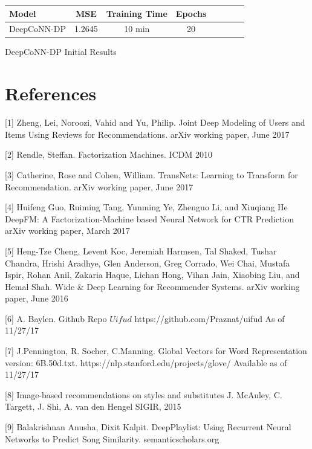 \documentclass[10pt,twocolumn,letterpaper]{article}
\begin{document}
\begin{exhibit}
\begin{center}
{\small
\begin{tabular}{l|ccccccc}
\hline
Model & MSE & Training Time & Epochs \\
\hline
DeepCoNN-DP & 1.2645 & 10 min & 20  \\
\hline
\end{tabular}
}
\end{center}
\caption{DeepCoNN-DP Initial Results}
\end{exhibit}


\section{References}

[1] Zheng, Lei, Noroozi, Vahid and Yu, Philip. Joint Deep Modeling of Users
 and Items Using Reviews for Recommendations. arXiv working paper, June 2017

[2] Rendle, Steffan. Factorization Machines. ICDM 2010

[3] Catherine, Rose and Cohen, William. TransNets: Learning to Transform
for Recommendation. arXiv working paper, June 2017

[4] Huifeng Guo, Ruiming Tang, Yunming Ye, Zhenguo Li, and Xiuqiang He
DeepFM: A Factorization-Machine based Neural Network for CTR Prediction
arXiv working paper, March 2017

[5] Heng-Tze Cheng, Levent Koc, Jeremiah Harmsen, Tal Shaked, Tushar Chandra, Hrishi Aradhye, Glen Anderson, Greg Corrado, Wei Chai, Mustafa Ispir, Rohan Anil, Zakaria Haque, Lichan Hong, Vihan Jain, Xiaobing Liu, and Hemal Shah.
Wide \& Deep Learning for Recommender Systems. arXiv working paper, June 2016

[6] A. Baylen. Github Repo $Uifud$
https://github.com/Praznat/uifud
As of 11/27/17 

[7] J.Pennington, R. Socher, C.Manning. Global Vectors for Word Representation 
version: 6B.50d.txt. https://nlp.stanford.edu/projects/glove/ 
Available as of 11/27/17 

[8] Image-based recommendations on styles and substitutes
J. McAuley, C. Targett, J. Shi, A. van den Hengel
SIGIR, 2015

[9] Balakrishnan Anusha, Dixit Kalpit. DeepPlaylist: Using Recurrent Neural Networks to
Predict Song Similarity. semanticscholars.org 
\end{document}
